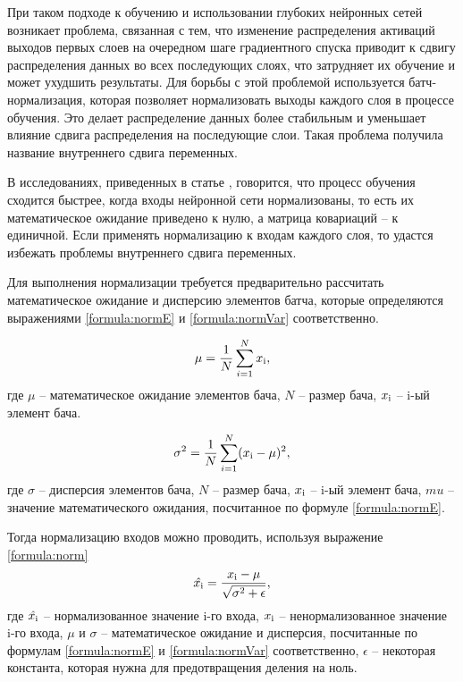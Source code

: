 При таком подходе к обучению и использовании глубоких нейронных сетей возникает проблема, связанная с тем, что изменение распределения активаций выходов первых слоев на очередном шаге градиентного спуска приводит к сдвигу распределения данных во всех последующих слоях, что затрудняет их обучение и может ухудшить результаты. Для борьбы с этой проблемой используется батч-нормализация, которая позволяет нормализовать выходы каждого слоя в процессе обучения. Это делает распределение данных более стабильным и уменьшает влияние сдвига распределения на последующие слои. Такая проблема получила название внутреннего сдвига переменных.

В исследованиях, приведенных в статье \cite{normalisation_lecun}, говорится, что процесс обучения сходится быстрее, когда входы нейронной сети нормализованы, то есть их математическое ожидание приведено к нулю, а матрица ковариаций -- к единичной. Если применять нормализацию к входам каждого слоя, то удастся избежать проблемы внутреннего сдвига переменных.

Для выполнения нормализации требуется предварительно рассчитать математическое ожидание и дисперсию элементов батча, которые определяются выражениями \ref{formula:normE} и \ref{formula:normVar} соответственно.

\begin{equation}\label{formula:normE}
\mu = \frac{1}{N} \sum\limits_{i=1}^{N}x_{\rm{i}},
\end{equation}
где $\mu$ -- математическое ожидание элементов бача, $N$ -- размер бача, $x_{\rm{i}}$ -- i-ый элемент бача.

\begin{equation}\label{formula:normVar}
\sigma^2 = \frac{1}{N} \sum\limits_{i=1}^{N}(x_{\rm{i}} - \mu)^2,
\end{equation}
где $\sigma$ -- дисперсия элементов бача, $N$ -- размер бача, $x_{\rm{i}}$ -- i-ый элемент бача, $mu$ -- значение математического ожидания, посчитанное по формуле \ref{formula:normE}.

Тогда нормализацию входов можно проводить, используя выражение \ref{formula:norm}
\begin{equation}\label{formula:norm}
\hat{x_{\rm{i}}} = \frac{x_{\rm{i}} - \mu}{\sqrt{\sigma^2 + \epsilon}},
\end{equation}
где $\hat{x_{\rm{i}}}$ -- нормализованное значение i-го входа, $x_{\rm{i}}$ -- ненормализованное значение i-го входа, $\mu$ и $\sigma$ -- математическое ожидание и дисперсия, посчитанные по формулам \ref{formula:normE} и \ref{formula:normVar} соответственно, $\epsilon$ -- некоторая константа, которая нужна для предотвращения деления на ноль.


